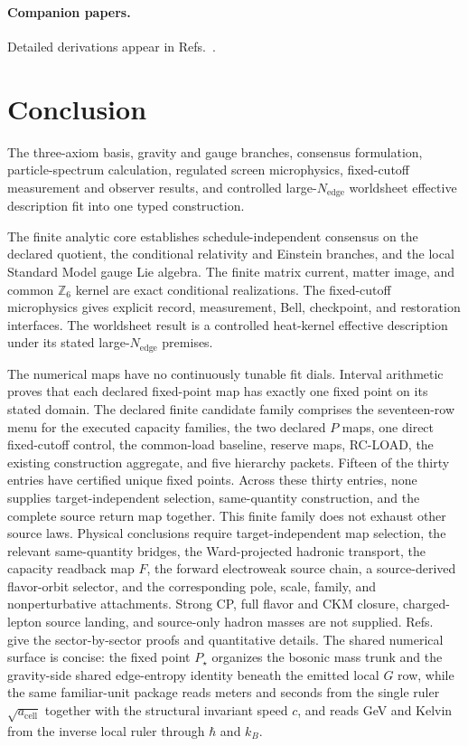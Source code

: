 \paragraph{Companion papers.}
Detailed derivations appear in Refs.~\cite{ophEinstein,ophGauge,ophconsensus,ophmicrophysics,ophparticles,ophyangmills,ophstringselector}.

\section{Conclusion}

The three-axiom basis, gravity and gauge branches, consensus formulation,
particle-spectrum calculation, regulated screen microphysics, fixed-cutoff
measurement and observer results, and controlled
large-\(N_{\mathrm{edge}}\) worldsheet effective description fit into one
typed construction.

The finite analytic core establishes schedule-independent consensus on the declared quotient,
the conditional relativity and Einstein branches, and the local Standard
Model gauge Lie algebra. The finite matrix current, matter image, and common
\(\mathbb Z_6\) kernel are exact conditional realizations. The fixed-cutoff microphysics
gives explicit record, measurement, Bell, checkpoint, and restoration interfaces. The
worldsheet result is a controlled heat-kernel effective description under its stated
large-\(N_{\mathrm{edge}}\) premises.

The numerical maps have no continuously tunable fit dials. Interval arithmetic proves that each
declared fixed-point map has exactly one fixed point on its stated domain. The
declared finite candidate family comprises the seventeen-row menu for the executed capacity families,
the two declared \(P\) maps, one direct fixed-cutoff control, the common-load baseline, reserve maps,
RC-LOAD, the existing construction aggregate, and five hierarchy packets.
Fifteen of the thirty entries have certified unique fixed points.
Across these thirty entries, none supplies target-independent selection,
same-quantity construction, and the complete source return map together.
This finite family does not exhaust other source laws.
Physical conclusions
require target-independent map selection, the relevant same-quantity bridges,
the Ward-projected hadronic transport, the capacity readback map \(F\), the forward
electroweak source chain, a source-derived flavor-orbit selector, and the corresponding pole,
scale, family, and nonperturbative attachments. Strong CP, full flavor and CKM closure,
charged-lepton source landing, and source-only hadron masses are not supplied.
Refs.~\cite{ophEinstein,ophGauge,ophconsensus,ophmicrophysics,ophparticles} give the
sector-by-sector proofs and quantitative details. The shared numerical surface is concise: the fixed point \(P_\star\)
organizes the bosonic mass trunk and the gravity-side shared edge-entropy identity beneath the
emitted local \(G\) row, while the same familiar-unit package reads meters and seconds from the
single ruler \(\sqrt{a_{\mathrm{cell}}}\) together with the structural invariant speed \(c\), and
reads GeV and Kelvin from the inverse local ruler through \(\hbar\) and \(k_B\).
